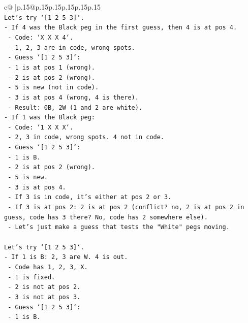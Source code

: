 \documentclass{article}
\begin{document}
{\begin{supertabular}{c@{$\;$}|p{.15\linewidth}@{}p{.15\linewidth}p{.15\linewidth}p{.15\linewidth}p{.15\linewidth}p{.15\linewidth}}
{{{\\ 
\texttt{Let's try `{[}1 2 5 3{]}`.} \\
\texttt{{-} If 4 was the Black peg in the first guess, then 4 is at pos 4.} \\
\texttt{  {-} Code: `X X X 4`.} \\
\texttt{  {-} 1, 2, 3 are in code, wrong spots.} \\
\texttt{  {-} Guess `{[}1 2 5 3{]}`:} \\
\texttt{    {-} 1 is at pos 1 (wrong).} \\
\texttt{    {-} 2 is at pos 2 (wrong).} \\
\texttt{    {-} 5 is new (not in code).} \\
\texttt{    {-} 3 is at pos 4 (wrong, 4 is there).} \\
\texttt{    {-} Result: 0B, 2W (1 and 2 are white).} \\
\texttt{{-} If 1 was the Black peg:} \\
\texttt{  {-} Code: `1 X X X`.} \\
\texttt{  {-} 2, 3 in code, wrong spots. 4 not in code.} \\
\texttt{  {-} Guess `{[}1 2 5 3{]}`:} \\
\texttt{    {-} 1 is B.} \\
\texttt{    {-} 2 is at pos 2 (wrong).} \\
\texttt{    {-} 5 is new.} \\
\texttt{    {-} 3 is at pos 4.} \\
\texttt{    {-} If 3 is in code, it's either at pos 2 or 3.} \\
\texttt{    {-} If 3 is at pos 2: 2 is at pos 2 (conflict? no, 2 is at pos 2 in guess, code has 3 there? No, code has 2 somewhere else).} \\
\texttt{    {-} Let's just make a guess that tests the "White" pegs moving.} \\
\\ 
\texttt{Let's try `{[}1 2 5 3{]}`.} \\
\texttt{{-} If 1 is B: 2, 3 are W. 4 is out.} \\
\texttt{  {-} Code has 1, 2, 3, X.} \\
\texttt{  {-} 1 is fixed.} \\
\texttt{  {-} 2 is not at pos 2.} \\
\texttt{  {-} 3 is not at pos 3.} \\
\texttt{  {-} Guess `{[}1 2 5 3{]}`:} \\
\texttt{    {-} 1 is B.} \\
}}}
\end{supertabular}}
\end{document}
